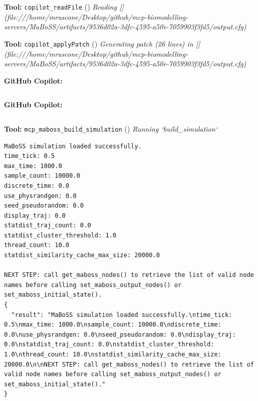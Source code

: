\documentclass[11pt,a4paper]{article}
\begin{document}
\begin{toolokbox}
\textbf{Tool:} \texttt{copilot\_readFile} (\checkmark)
\textit{Reading [](file:///home/mruscone/Desktop/github/mcp-biomodelling-servers/MaBoSS/artifacts/9536d02a-3dfc-4595-a50e-7059903f3fd5/output.cfg)}
\end{toolokbox}
\begin{toolokbox}
\textbf{Tool:} \texttt{copilot\_applyPatch} (\checkmark)
\textit{Generating patch (26 lines) in [](file:///home/mruscone/Desktop/github/mcp-biomodelling-servers/MaBoSS/artifacts/9536d02a-3dfc-4595-a50e-7059903f3fd5/output.cfg)}
\end{toolokbox}
\begin{copilotbox}
\textbf{GitHub Copilot:}

\begin{lstlisting}

\end{lstlisting}
\end{copilotbox}
\begin{copilotbox}
\textbf{GitHub Copilot:}

\begin{lstlisting}

\end{lstlisting}
\end{copilotbox}
\begin{toolokbox}
\textbf{Tool:} \texttt{mcp\_maboss\_build\_simulation} (\checkmark)
\textit{Running `build\_simulation`}
\begin{lstlisting}
MaBoSS simulation loaded successfully.
time_tick: 0.5
max_time: 1000.0
sample_count: 10000.0
discrete_time: 0.0
use_physrandgen: 0.0
seed_pseudorandom: 0.0
display_traj: 0.0
statdist_traj_count: 0.0
statdist_cluster_threshold: 1.0
thread_count: 10.0
statdist_similarity_cache_max_size: 20000.0

NEXT STEP: call get_maboss_nodes() to retrieve the list of valid node names before calling set_maboss_output_nodes() or set_maboss_initial_state().
{
  "result": "MaBoSS simulation loaded successfully.\ntime_tick: 0.5\nmax_time: 1000.0\nsample_count: 10000.0\ndiscrete_time: 0.0\nuse_physrandgen: 0.0\nseed_pseudorandom: 0.0\ndisplay_traj: 0.0\nstatdist_traj_count: 0.0\nstatdist_cluster_threshold: 1.0\nthread_count: 10.0\nstatdist_similarity_cache_max_size: 20000.0\n\nNEXT STEP: call get_maboss_nodes() to retrieve the list of valid node names before calling set_maboss_output_nodes() or set_maboss_initial_state()."
}
\end{lstlisting}
\end{toolokbox}
\end{document}
